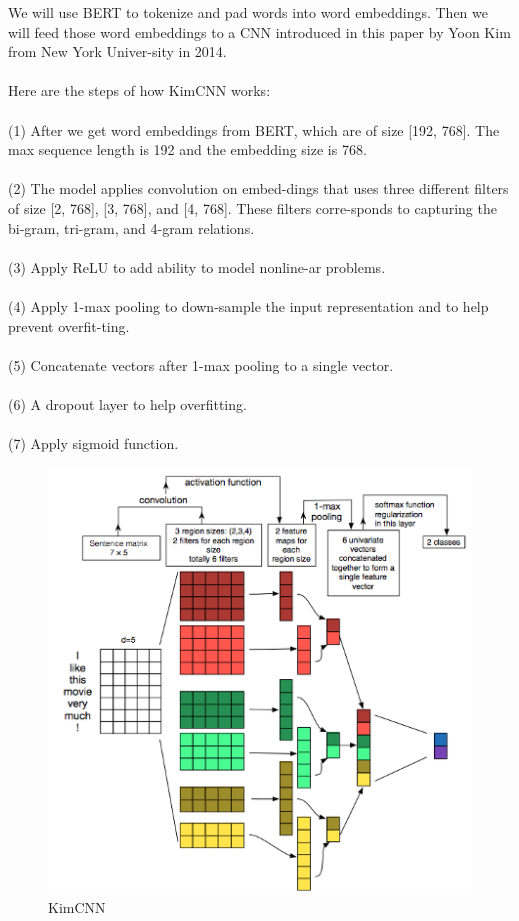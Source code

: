 \documentclass[11pt,a4paper]{article}
\begin{document}
We will use BERT to tokenize and pad words into word embeddings. Then we will feed those word embeddings to a CNN introduced in this paper \cite{kimcnn} by Yoon Kim from New York Univer-sity in 2014.\\
\\
Here are the steps of how KimCNN works:\\
\\
(1) After we get word embeddings from BERT, which are of size [192, 768]. The max sequence length is 192 and the embedding size is 768.
\\
\\
(2) The model applies convolution on embed-dings that uses three different filters of size [2, 768], [3, 768], and [4, 768]. These filters corre-sponds to capturing the bi-gram, tri-gram, and 4-gram relations.
\\
\\
(3) Apply ReLU to add ability to model nonline-ar problems.\\
\\
(4) Apply 1-max pooling to down-sample the input representation and to help prevent overfit-ting.
\\
\\
(5) Concatenate vectors after 1-max pooling to a single vector.
\\
\\
(6) A dropout layer to help overfitting.
\\
\\
(7) Apply sigmoid function.

\begin{figure}[!htb]
	\centering
	\includegraphics{figures/figure5.png}
	\caption{\label{fig:my-label} KimCNN \cite{kimcnn}}
\end{figure}
\end{document}

